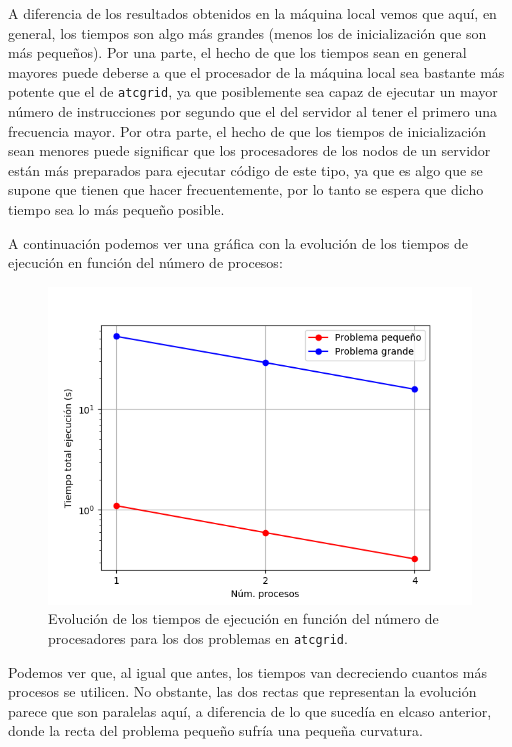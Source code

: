 \documentclass[11pt,a4paper]{article}
\begin{document}
A diferencia de los resultados obtenidos en la máquina local vemos que aquí, en general, los
tiempos son algo más grandes (menos los de inicialización que son más pequeños). Por una parte,
el hecho de que los tiempos sean en general mayores puede deberse a que el procesador de la
máquina local sea bastante más potente que el de \texttt{atcgrid}, ya que posiblemente sea capaz
de ejecutar un mayor número de instrucciones por segundo que el del servidor al tener el
primero una frecuencia mayor. Por otra parte, el hecho de que los tiempos de inicialización
sean menores puede significar que los procesadores de los nodos de un servidor están más
preparados para ejecutar código de este tipo, ya que es algo que se supone que tienen que hacer
frecuentemente, por lo tanto se espera que dicho tiempo sea lo más pequeño posible.

A continuación podemos ver una gráfica con la evolución de los tiempos de ejecución en función
del número de procesos:

\begin{figure}[H]
  \centering
  \includegraphics[scale=0.6]{img/atcgrid-tiempos}
  \caption{Evolución de los tiempos de ejecución en función del número de procesadores para
  los dos problemas en \texttt{atcgrid}.}
  \label{fig:atcgrid-tiempos}
\end{figure}

Podemos ver que, al igual que antes, los tiempos van decreciendo cuantos más procesos se
utilicen. No obstante, las dos rectas que representan la evolución parece que son paralelas aquí,
a diferencia de lo que sucedía en elcaso anterior, donde la recta del problema pequeño
sufría una pequeña curvatura.
\end{document}
